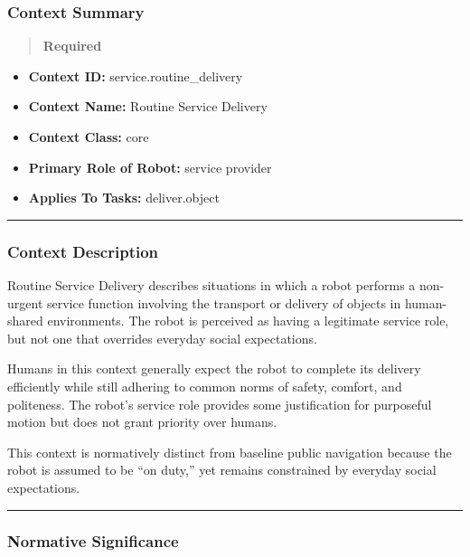 \documentclass[utf8]{frontiers_suppmat} %
\providecommand{\tightlist}{%
  \setlength{\itemsep}{0pt}\setlength{\parskip}{0pt}}
\begin{document}
\subsubsection{Context Summary}\label{context-summary}

\begin{quote}
\textbf{Required}
\end{quote}

\begin{itemize}
\tightlist
\item
  \textbf{Context ID:} service.routine\_delivery
\item
  \textbf{Context Name:} Routine Service Delivery
\item
  \textbf{Context Class:} core
\item
  \textbf{Primary Role of Robot:} service provider
\item
  \textbf{Applies To Tasks:} deliver.object
\end{itemize}

\begin{center}\rule{0.5\linewidth}{0.5pt}\end{center}

\subsubsection{Context Description}\label{context-description}

Routine Service Delivery describes situations in which a robot performs
a non-urgent service function involving the transport or delivery of
objects in human-shared environments. The robot is perceived as having a
legitimate service role, but not one that overrides everyday social
expectations.

Humans in this context generally expect the robot to complete its
delivery efficiently while still adhering to common norms of safety,
comfort, and politeness. The robot's service role provides some
justification for purposeful motion but does not grant priority over
humans.

This context is normatively distinct from baseline public navigation
because the robot is assumed to be ``on duty,'' yet remains constrained
by everyday social expectations.

\begin{center}\rule{0.5\linewidth}{0.5pt}\end{center}

\subsubsection{Normative Significance}\label{normative-significance}
\end{document}

